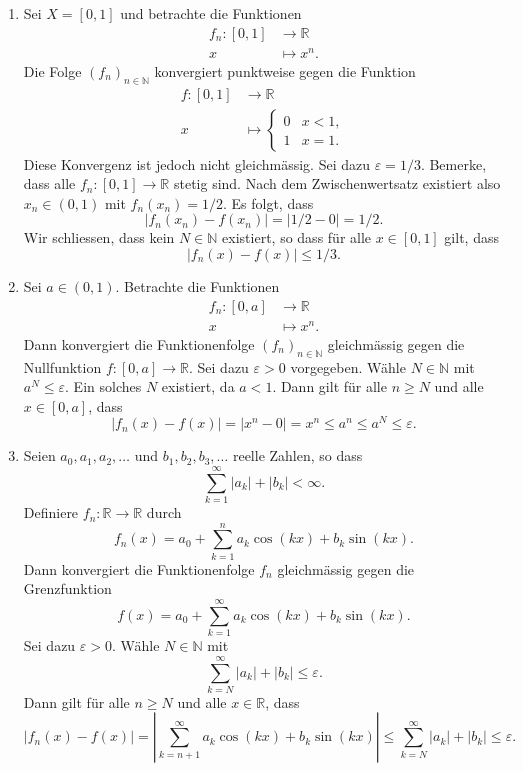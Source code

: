 \documentclass[../main.tex]{subfiles}
\begin{document}
\begin{examples}
  \leavevmode
  \begin{enumerate}[(1)]
    \item Sei $X = [0, 1]$ und betrachte die Funktionen
      \begin{align*}
        f_n \colon [0, 1] & \to \mathbb{R} \\
        x & \mapsto x^n.
      \end{align*}
      Die Folge ${(f_{n})}_{n \in \mathbb{N}}$ konvergiert
      punktweise gegen die Funktion
      \begin{align*}
        f \colon [0, 1] & \to \mathbb{R} \\
        x & \mapsto
        \begin{cases}
          0 & x < 1,\\
          1 & x = 1.
        \end{cases}
      \end{align*}
      Diese Konvergenz ist jedoch nicht gleichmässig.
      Sei dazu $\varepsilon = 1/3$.
      Bemerke, dass alle $f_n \colon [0, 1] \to \mathbb{R}$ stetig sind.
      Nach dem Zwischenwertsatz existiert also $x_n \in (0, 1)$ 
      mit $f_n(x_n) = 1/2$.
      Es folgt, dass
      \[
        |f_n(x_n) - f(x_n)| = |1/2 - 0| = 1/2.
      \]
      Wir schliessen, dass kein $N \in \mathbb{N}$ existiert, so dass
      für alle $x \in [0, 1]$ gilt, dass \[|f_n(x) - f(x)| \leq 1/3.\]
    \item Sei $a \in (0, 1)$.
      Betrachte die Funktionen
      \begin{align*}
        f_n \colon [0, a] & \to \mathbb{R} \\
        x & \mapsto x^n.
      \end{align*}
      Dann konvergiert die Funktionenfolge ${(f_{n})}_{n \in \mathbb{N}}$ 
      gleichmässig gegen die Nullfunktion $f \colon[0, a] \to \mathbb{R}$.
      Sei dazu $\varepsilon > 0$ vorgegeben. Wähle $N \in \mathbb{N}$ mit
      $a^N \leq \varepsilon$. Ein solches $N$ existiert, da $a < 1$.
      Dann gilt für alle $n \geq N$ und alle $x \in [0, a]$, dass
      \[
        |f_n(x) - f(x)| = |x^n - 0| = x^n \leq a^n \leq a^N \leq \varepsilon.
      \]
    \item Seien $a_0, a_1, a_2, \dots$  und $b_1, b_2, b_3, \dots$ reelle Zahlen,
      so dass
      \[
        \sum_{k=1}^{\infty} |a_k| + |b_k| < \infty.
      \]
      Definiere $f_n \colon \mathbb{R} \to \mathbb{R}$ durch
      \[
        f_n(x) = a_0 + \sum_{k=1}^{n} a_k \cos(kx) + b_k \sin(kx).
      \]
      Dann konvergiert die Funktionenfolge $f_n$ gleichmässig gegen die
      Grenzfunktion
      \[
        f(x) = a_0 + \sum_{k=1}^{\infty} a_k \cos(kx) + b_k \sin (kx).
      \]
      Sei dazu $\varepsilon > 0$.
      Wähle $N \in \mathbb{N}$ mit
      \[
        \sum_{k=N}^{\infty} |a_k| + |b_k| \leq \varepsilon.
      \]
      Dann gilt für alle $n \geq N$ und alle $x \in \mathbb{R}$, dass
      \[
        |f_n(x) - f(x)| = \left| \sum_{k = n + 1}^{\infty} a_k \cos(kx)
        + b_k \sin (kx)\right| \leq \sum_{k=N}^{\infty} |a_k| + |b_k| \leq \varepsilon.
      \]


\end{enumerate}
\end{examples}
\end{document}
